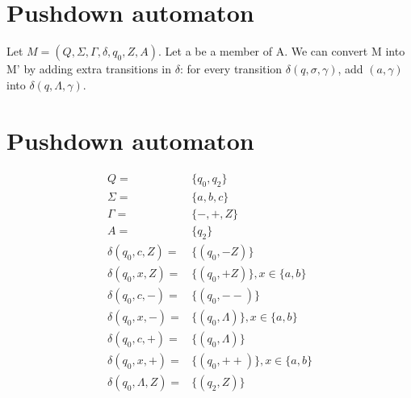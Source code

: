 \documentclass{article}
\begin{document}
\section{Pushdown automaton}
Let $M = (Q, \Sigma, \Gamma, \delta, q_0, Z, A)$. Let a be a member of A. We
can convert M into M' by adding extra transitions in $\delta$: for every
transition $\delta(q, \sigma, \gamma)$, add $(a, \gamma)$ into $\delta(q,
\Lambda, \gamma) $.
\section{Pushdown automaton}
\begin{align*}
Q =& \{q_0, q_2\}\\
\Sigma =& \{a, b, c\}\\
\Gamma =& \{-, +, Z\}\\
A =& \{q_2\}\\
\delta(q_0, c, Z) =& \{(q_0, -Z)\}\\
\delta(q_0, x, Z) =& \{(q_0, +Z)\}, x \in \{a, b\}\\
\delta(q_0, c, -) =& \{(q_0, --)\}\\
\delta(q_0, x, -) =& \{(q_0, \Lambda)\}, x \in \{a, b\}\\
\delta(q_0, c, +) =& \{(q_0, \Lambda)\}\\
\delta(q_0, x, +) =& \{(q_0, ++)\}, x \in \{a, b\}\\
\delta(q_0, \Lambda, Z) =& \{(q_2, Z)\}
\end{align*}
\end{document}
